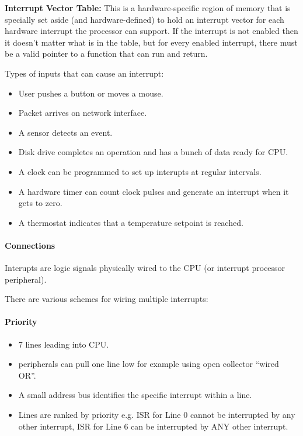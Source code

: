 \documentclass{article}	%
\begin{document}
{\bf Interrupt Vector Table:}  This is a hardware-specific region of memory that is specially set aside (and hardware-defined) to hold an interrupt vector for each hardware interrupt the processor can support.   If the interrupt is not enabled then it doesn’t matter what is in the table, but for every enabled interrupt, there must be a valid pointer to a function that can run and return. 
 

Types of inputs that can cause an interrupt:
\begin{itemize}
        \item User pushes a button or moves a mouse.
        \item Packet arrives on network interface.
        \item A sensor detects an event.
        \item Disk drive
 completes an operation and has a bunch of data ready for CPU.	%
        \item A clock
 can be programmed to set up interupts at regular intervals.	%
        \item A hardware timer
 can count clock pulses and generate an interrupt when it gets to zero.	%
        \item A thermostat
 indicates that a temperature setpoint is reached.	%
\end{itemize}


\paragraph{Connections}

Interupts are logic signals physically wired to the CPU
(or interrupt processor peripheral).	%

There are various schemes for wiring multiple interrupts:

\paragraph{Priority}

\begin{itemize}
        \item 7 lines leading into CPU.
        \item peripherals can pull one line low
 for example using open collector ``wired OR''.	%
        \item A small address bus identifies the specific
        interrupt within a line.
        \item Lines are ranked by priority
 e.g. ISR for Line 0 cannot be interrupted by any other interrupt,	%
ISR for Line 6 can be interrupted by ANY other interrupt.	%
\end{itemize}
\end{document}
